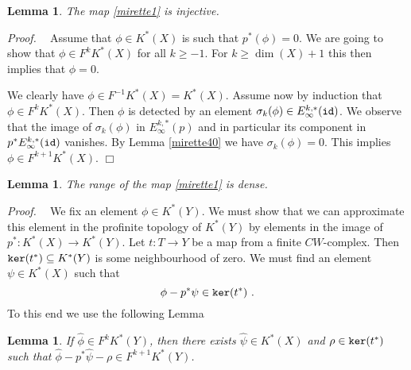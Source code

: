 \documentclass[12pt]{article}
\newtheorem{lem}[theorem]{Lemma}
\newcommand{\id}{{\tt id}}
\renewcommand{\ker}{{\tt ker}}
\def\hB{\hspace*{\fill}$\Box$ \newline\noindent}
\newcommand{\proof}{{\it Proof.$\:\:\:\:$}}
\newcommand{\nat}{{\mathbb{N}}}
\begin{document}
%
%
%






\begin{lem}\label{mirette5}
The map \eqref{mirette1} is injective.
\end{lem}
\proof
Assume that $\phi\in  K^{*}(X)$ is such that $p^{*}(\phi)=0$. We are going to show that 
 $\phi\in F^{k}K^{*}(X) $ for all $k\ge -1$. For $k\ge \dim(X)+1$ this then implies that $\phi=0$.
 
We clearly have $\phi\in F^{-1}K^{*}(X)=K^{*}(X)$.  Assume now by induction that $\phi\in  F^{k}K^{*}(X)$.
Then $\phi$ is detected by an element $\sigma_{k}(\phi)\in E^{k,*}_{\infty}(\id)$.
We observe that  the image of $\sigma_{k}(\phi)$ in $E^{k,*}_{\infty}(p)$ 
 and in particular its component in $p^{*}E^{k,*}_{\infty}(\id)$ vanishes.  By Lemma \ref{mirette40}  we have  $\sigma_{k}(\phi)=0$. This implies $\phi\in F^{k+1}K^{*}(X) $.
\hB 


\begin{lem}\label{mirette2}
The range of the map  \eqref{mirette1} is dense.
\end{lem}
\proof
We fix an element $\phi\in K^{*}(Y)$.
We must show that we can approximate this element in the profinite topology of $K^{*}(Y)$ by elements in the image of $p^{*}:K^{*}(X)\to K^{*}(Y)$.
 Let $t:T\to Y$ be a map from a finite $CW$-complex. Then $\ker(t^{*})\subseteq K^{*}(Y)$ is some neighbourhood of zero. We must  find an element
 $\psi\in K^{*}(X)$ such that 
 \begin{equation}\label{thegoal}\phi-p^{*}\psi\in \ker(t^{*})\ .\end{equation}
To this end we use the following Lemma
\begin{lem}\label{mirette3}
If $\hat \phi\in F^{k}K^{*}(Y)$, then there exists $\hat \psi\in K^{*}(X)$ and $\rho\in \ker(t^{*})$ such that
$\hat \phi-p^{*}\hat \psi-\rho\in F^{k+1}K^{*}(Y)$.
\end{lem}
\end{document}
